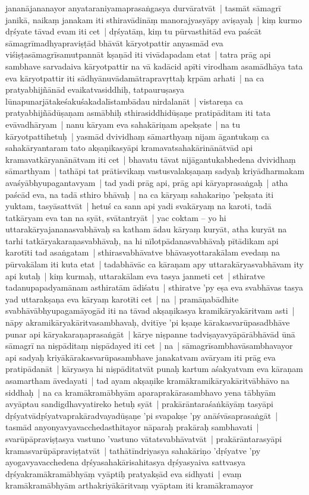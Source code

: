 \documentclass[article,12pt,a4paper]{memoir}%
\begin{document}
jananājananayor anyataraniyamaprasaṅgasya durvāratvāt | tasmāt sāmagrī janikā, naikaṃ janakam iti sthiravādināṃ manorajyasyāpy aviṣayaḥ | \label{thakur75-90.9} kiṃ kurmo dṛśyate tāvad evam iti cet | dṛśyatāṃ, kiṃ tu pūrvasthitād eva paścāt sāmagrīmadhyapraviṣṭād bhāvāt kāryotpattir anyasmād eva viśiṣṭasāmagrīsamutpannāt kṣaṇād iti vivādapadam etat | tatra prāg api sambhave sarvadaiva kāryotpattir na vā kadācid apīti virodham asamādhāya tata eva kāryotpattir iti sādhyānuvādamātrapravṛttaḥ kṛpām arhati | \label{thakur75-90.14} na ca pratyabhijñānād evaikatvasiddhiḥ, tatpauruṣasya lūnapunarjātakeśakuśakadalīstambādau nirdalanāt | vistareṇa ca pratyabhijñādūṣaṇam asmābhiḥ sthirasiddhidūṣaṇe pratipāditam iti tata evāvadhāryam | \label{thakur75-90.17} nanu kāryam eva sahakāriṇam apekṣate | na tu kāryotpattihetuḥ | yasmād dvividhaṃ sāmarthyaṃ nijam āgantukaṃ ca sahakāryantaram tato akṣaṇikasyāpi kramavatsahakārinānātvād api kramavatkāryanānātvam iti cet | \label{thakur75-90.19} bhavatu tāvat nijāgantukabhedena dvividhaṃ sāmarthyam | tathāpi tat prātisvikaṃ vastusvalakṣaṇaṃ sadyaḥ kriyādharmakam avaśyābhyupagantavyam | tad yadi prāg api, prāg api kāryaprasaṅgaḥ | atha paścād eva, na tadā sthiro bhāvaḥ | \label{thakur75-90.23} na ca kāryaṃ sahakariṇo 'pekṣata iti yuktam, tasyāsattvāt | hetuś ca sann api yadi svakāryaṃ na karoti, tadā tatkāryam eva tan na syāt, svātantryāt | \label{thakur75-90.25} yac coktam – yo hi uttarakāryajananasvabhāvaḥ sa katham ādau kāryaṃ kuryāt, atha kuryāt na tarhi tatkāryakaraṇasvabhāvaḥ, na hi nīlotpādanasvabhāvaḥ pītādikam api karotīti tad asaṅgatam | sthirasvabhāvatve bhāvasyottarakālam evedaṃ na pūrvakālam iti kuta etat | tadabhāvāc ca kāraṇam apy uttarakāryasvabhāvam ity api kutaḥ | \label{thakur75-90.29} kiṃ kurmaḥ, uttarakālam eva tasya janmeti cet | sthiratve tadanupapadyamānam asthiratām ādiśatu | sthiratve 'py eṣa eva svabhāvas tasya yad uttarakṣaṇa eva kāryaṃ karotīti cet | na | pramāṇabādhite svabhāvābhyupagamāyogād iti na tāvad akṣaṇikasya kramikāryakāritvam asti | nāpy akramikāryakāritvasambhavaḥ, dvitīye 'pi kṣaṇe kārakasvarūpasadbhāve punar api kāryakaraṇaprasaṅgāt | \label{thakur75-91.4} kārye niṣpanne tadviṣayavyāpārābhāvād ūnā sāmagrī na niṣpāditaṃ niṣpādayed iti cet | na | sāmagrīsambhavāsambhavayor api sadyaḥ kriyākārakasvarūpasambhave janakatvam avāryam iti prāg eva pratipādanāt | kāryasya hi niṣpāditatvāt punaḥ kartum aśakyatvam eva kāraṇam asamartham āvedayati | \label{thakur75-91.7} tad ayam akṣaṇike kramākramikāryakāritvābhāvo na siddhaḥ | na ca kramākramābhyām aparaprakārasambhavo yena tābhyām avyāptau sandigdhavyatireko hetuḥ syāt | prakārāntaraśaṅkāyāṃ tasyāpi dṛśyatvādṛśyatvaprakāradvayadūṣaṇe 'pi svapakṣe 'py anāśvāsaprasaṅgāt | tasmād anyonyavyavacchedasthitayor nāparaḥ prakāraḥ sambhavati | svarūpāpraviṣṭasya vastuno 'vastuno vātatsvabhāvatvāt | prakārāntarasyāpi kramasvarūpāpraviṣṭatvāt | tathātīndriyasya sahakāriṇo 'dṛśyatve 'py ayogavyavacchedena dṛśyasahakārisahitasya dṛśyasyaiva sattvasya dṛśyakramākramābhyāṃ vyāptiḥ pratyakṣād eva sidhyati | evaṃ kramākramābhyām arthakriyākāritvaṃ vyāptam iti kramākramayor 
\end{document}
